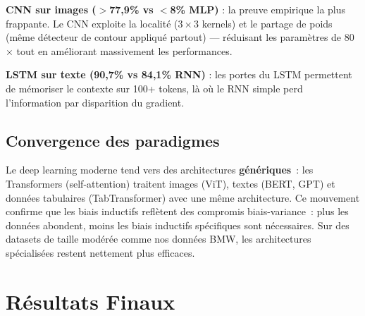 \documentclass[12pt,a4paper]{report}
\begin{document}
\begin{newbox}
\textbf{CNN sur images ($>$77,9\% vs $<$8\% MLP)} : la preuve empirique la plus frappante.
Le CNN exploite la localité ($3\times3$ kernels) et le partage de poids (même détecteur de 
contour appliqué partout) --- réduisant les paramètres de 80$\times$ tout en améliorant 
massivement les performances.

\textbf{LSTM sur texte (90,7\% vs 84,1\% RNN)} : les portes du LSTM permettent de 
mémoriser le contexte sur 100+ tokens, là où le RNN simple perd l'information par 
disparition du gradient.

\subsection*{Convergence des paradigmes}

Le deep learning moderne tend vers des architectures \textbf{génériques}~: les
Transformers (self-attention) traitent images (ViT), textes (BERT, GPT) et données
tabulaires (TabTransformer) avec une même architecture. Ce mouvement confirme que les
biais inductifs reflètent des compromis biais-variance~: plus les données abondent,
moins les biais inductifs spécifiques sont nécessaires. Sur des datasets de taille
modérée comme nos données BMW, les architectures spécialisées restent nettement plus
efficaces.
\end{newbox}

\section{Résultats Finaux}
\end{document}
